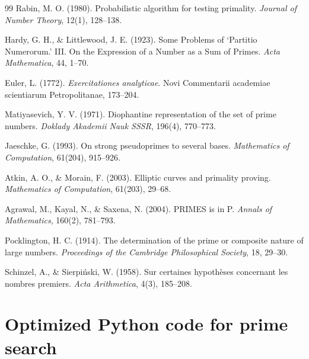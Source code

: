 \documentclass[11pt,a4paper]{article}
\theoremstyle{definition}
\theoremstyle{plain}
\begin{document}
\begin{thebibliography}{99}
Rabin, M. O. (1980).
Probabilistic algorithm for testing primality.
\textit{Journal of Number Theory}, 12(1), 128--138.

Hardy, G. H., \& Littlewood, J. E. (1923).
Some Problems of `Partitio Numerorum.' III. On the Expression of a Number as a Sum of Primes.
\textit{Acta Mathematica}, 44, 1--70.

Euler, L. (1772). 
\textit{Exercitationes analyticae}. 
Novi Commentarii academiae scientiarum Petropolitanae, 173--204.

Matiyasevich, Y. V. (1971). 
Diophantine representation of the set of prime numbers. 
\textit{Doklady Akademii Nauk SSSR}, 196(4), 770--773.

Jaeschke, G. (1993). 
On strong pseudoprimes to several bases. 
\textit{Mathematics of Computation}, 61(204), 915--926.

Atkin, A. O., \& Morain, F. (2003). 
Elliptic curves and primality proving. 
\textit{Mathematics of Computation}, 61(203), 29--68.

Agrawal, M., Kayal, N., \& Saxena, N. (2004). 
PRIMES is in P. 
\textit{Annals of Mathematics}, 160(2), 781--793.

Pocklington, H. C. (1914). 
The determination of the prime or composite nature of large numbers. 
\textit{Proceedings of the Cambridge Philosophical Society}, 18, 29--30.

Schinzel, A., \& Sierpi\'nski, W. (1958). 
Sur certaines hypoth\`eses concernant les nombres premiers. 
\textit{Acta Arithmetica}, 4(3), 185--208.

\end{thebibliography}

\appendix

\section{Optimized Python code for prime search}
\label{app:code}
\end{document}
